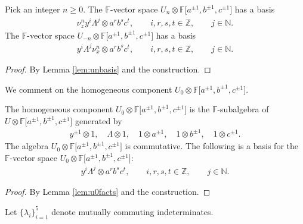 \begin{Lemma}
\label{lem:gradingbasis}
Pick an integer $n\geq 0$. The $\mathbb F$-vector space
$U_n \otimes
\mathbb F \lbrack a^{\pm 1}, b^{\pm 1}, c^{\pm 1}\rbrack $ has
a basis
\begin{gather*}
\nu^n_z y^i \Lambda^j
\otimes a^rb^sc^t,
 \qquad i,r,s,t\in \mathbb Z, \qquad j\in \mathbb N.
\end{gather*}
The $\mathbb F$-vector space $U_{-n} \otimes {\mathbb F}\lbrack a^{\pm 1}, b^{\pm 1}, c^{\pm 1} \rbrack$ has a basis
\begin{gather*}
y^i \Lambda^j \nu^n_x
\otimes a^rb^sc^t,
 \qquad i,r,s,t\in \mathbb Z,  \qquad j\in \mathbb N.
\end{gather*}
\end{Lemma}
\begin{proof}
By Lemma
\ref{lem:unbasis}
and the construction.
\end{proof}

We comment on the homogeneous component
$U_0 \otimes
\mathbb F \lbrack a^{\pm 1}, b^{\pm 1}, c^{\pm 1}\rbrack $.

\begin{Lemma}
\label{lem:u0tensor}
The homogeneous component
$U_0 \otimes
\mathbb F \lbrack a^{\pm 1}, b^{\pm 1}, c^{\pm 1}\rbrack $
is the $\mathbb F$-subalgebra of
$
U
\otimes
\mathbb F \lbrack a^{\pm 1}, b^{\pm 1}, c^{\pm 1}\rbrack $
generated by
\begin{gather*}
y^{\pm 1}\otimes 1,\quad
\Lambda \otimes 1, \quad
1\otimes a^{\pm 1},
\quad
1\otimes b^{\pm 1},
\quad
1\otimes c^{\pm 1}.
\end{gather*}
The algebra
$U_0 \otimes
\mathbb F \lbrack a^{\pm 1}, b^{\pm 1}, c^{\pm 1}\rbrack $
is commutative.
The following is a basis for the
$\mathbb F$-vector space
$U_0 \otimes
\mathbb F \lbrack a^{\pm 1}, b^{\pm 1}, c^{\pm 1}\rbrack $:
\begin{gather*}
y^i \Lambda^j\otimes a^r b^s c^t, \qquad i,r,s,t\in \mathbb Z, \qquad j\in \mathbb N.
\end{gather*}
\end{Lemma}
\begin{proof}
By Lemma
\ref{lem:u0facts} and the construction.
\end{proof}

 Let $\lbrace \lambda_i\rbrace_{i=1}^5 $ denote mutually
commuting indeterminates.

